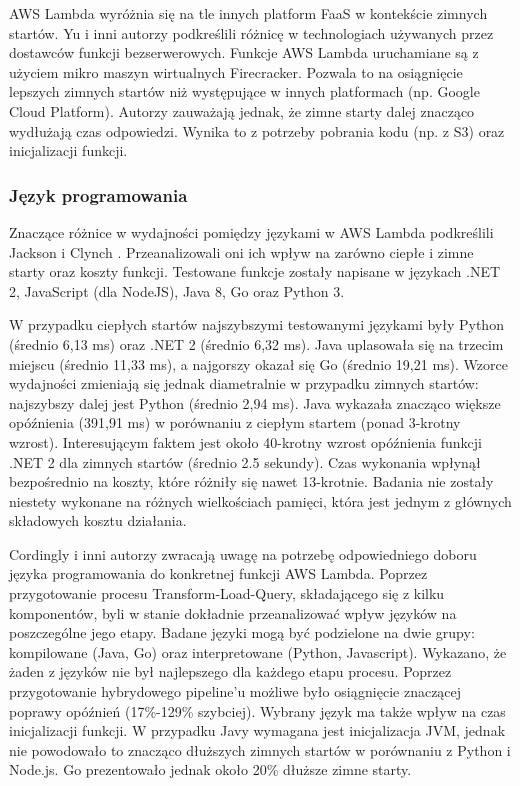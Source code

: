 AWS Lambda wyróżnia się na tle innych platform FaaS w kontekście zimnych startów.
Yu i inni autorzy \cite{10.1145/3419111.3421280} podkreślili różnicę w technologiach używanych przez dostawców funkcji bezserwerowych.
Funkcje AWS Lambda uruchamiane są z użyciem mikro maszyn wirtualnych Firecracker.
Pozwala to na osiągnięcie lepszych zimnych startów niż występujące w innych platformach (np. Google Cloud Platform).
Autorzy zauważają jednak, że zimne starty dalej znacząco wydłużają czas odpowiedzi.
Wynika to z potrzeby pobrania kodu (np. z S3) oraz inicjalizacji funkcji.

\subsubsection*{Język programowania}

Znaczące różnice w wydajności pomiędzy językami w AWS Lambda podkreślili Jackson i Clynch  \cite{8605773}. Przeanalizowali oni ich wpływ na zarówno ciepłe i zimne starty oraz koszty funkcji. Testowane funkcje zostały napisane w językach .NET 2, JavaScript (dla NodeJS), Java 8, Go oraz Python 3. 

W przypadku ciepłych startów najszybszymi testowanymi językami były Python (średnio 6,13 ms) oraz  .NET 2 (średnio 6,32 ms). 
Java uplasowała się na trzecim miejscu (średnio 11,33 ms), a najgorszy okazał się Go (średnio 19,21 ms). 
Wzorce wydajności zmieniają się jednak diametralnie w przypadku zimnych startów: najszybszy dalej jest Python (średnio 2,94 ms). 
Java wykazała znacząco większe opóźnienia (391,91 ms) w porównaniu z ciepłym startem (ponad 3-krotny wzrost). 
Interesującym faktem jest około 40-krotny wzrost opóźnienia funkcji .NET 2 dla zimnych startów (średnio 2.5 sekundy). 
Czas wykonania wpłynął bezpośrednio na koszty, które różniły się nawet 13-krotnie. 
Badania nie zostały niestety wykonane na różnych wielkościach pamięci, która jest jednym z głównych składowych kosztu działania.

Cordingly i inni autorzy \cite{Cordingly2020704} zwracają uwagę na potrzebę odpowiedniego doboru języka programowania do konkretnej funkcji AWS Lambda. 
Poprzez przygotowanie procesu Transform-Load-Query, składającego się z kilku komponentów, byli w stanie dokładnie przeanalizować wpływ języków na poszczególne jego etapy. 
Badane języki mogą być podzielone na dwie grupy: kompilowane (Java, Go) oraz interpretowane (Python, Javascript). Wykazano, że żaden z języków nie był najlepszego dla każdego etapu procesu. 
Poprzez przygotowanie hybrydowego pipeline’u możliwe było osiągnięcie znaczącej poprawy opóźnień (17\%-129\% szybciej). Wybrany język ma także wpływ na czas inicjalizacji funkcji. 
W przypadku Javy wymagana jest inicjalizacja JVM, jednak nie powodowało to znacząco dłuższych zimnych startów w porównaniu z Python i Node.js. Go prezentowało jednak około 20\% dłuższe zimne starty.

